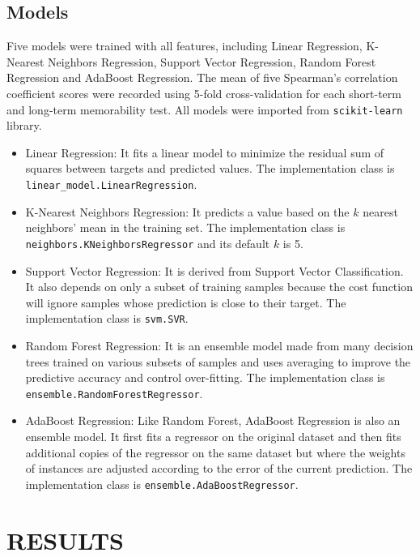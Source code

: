 \documentclass[conference, compsoc]{IEEEtran}
\begin{document}
{\subsection{Models}
Five models were trained with all features,
including Linear Regression, K-Nearest Neighbors Regression, Support Vector Regression, Random Forest Regression and AdaBoost Regression.
The mean of five Spearman's correlation coefficient scores were recorded using 5-fold cross-validation for each short-term and long-term memorability test.
All models were imported from \verb|scikit-learn| library.

\begin{itemize}
    \item Linear Regression: It fits a linear model to minimize the residual sum of squares between targets and predicted values.
    The implementation class is \verb|linear_model.LinearRegression|.

    \item K-Nearest Neighbors Regression: It predicts a value based on the $k$ nearest neighbors' mean in the training set.
    The implementation class is \verb|neighbors.KNeighborsRegressor| and its default $k$ is 5.

    \item Support Vector Regression: It is derived from Support Vector Classification.
    It also depends on only a subset of training samples because the cost function will ignore samples whose prediction is close to their target.
    The implementation class is \verb|svm.SVR|.

    \item Random Forest Regression:
    It is an ensemble model made from many decision trees trained on various subsets of samples and uses averaging to improve the predictive accuracy and control over-fitting.
    The implementation class is \verb|ensemble.RandomForestRegressor|.

    \item AdaBoost Regression: Like Random Forest, AdaBoost Regression is also an ensemble model.
    It first fits a regressor on the original dataset and then fits additional copies of the regressor on the same dataset
    but where the weights of instances are adjusted according to the error of the current prediction.
    The implementation class is \verb|ensemble.AdaBoostRegressor|.
\end{itemize}


\section{RESULTS}

}
\end{document}
